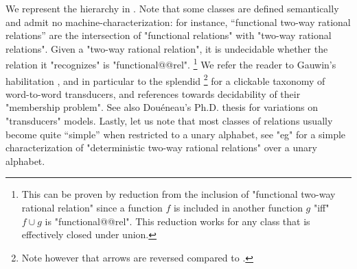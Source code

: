 We represent the hierarchy in .
Note that some classes are defined semantically and admit no machine-characterization:
for instance, ``functional two-way rational relations'' are the intersection
of "functional relations" with  "two-way rational relations".
Given a "two-way rational relation", it is undecidable whether the relation it
"recognizes" is "functional@@rel".%
\footnote{This can be proven by reduction from the inclusion of "functional two-way rational relation" since a function $f$ is included in another function $g$
"iff" $f\cup g$ is "functional@@rel". This reduction works for any class that
is effectively closed under union.}
We refer the reader to
Gauwin's habilitation \cite{Gauwin2020Transductions}, and in particular
to the splendid \cite[Figure~2.1, p.~16]{Gauwin2020Transductions}%
\footnote{Note however that arrows are reversed compared to
.}
for a clickable taxonomy of word-to-word transducers, and references towards
decidability of their "membership problem".
See also Douéneau's Ph.D. thesis \cite[\S~1]{Douéneau2023PhD} for variations on
"transducers" models.
Lastly, let us note that most classes of relations usually become quite ``simple'' when restricted 
to a unary alphabet, see "eg" \cite[Theorem~1]{ChoffrutGuillon2014UnaryTransducers} for a simple
characterization of "deterministic two-way rational relations" over a unary alphabet.